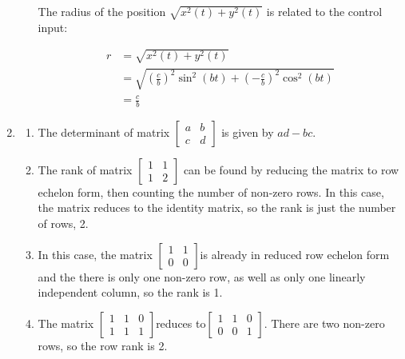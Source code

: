 \documentclass[11pt]{article}
\theoremstyle{definition}
\begin{document}
\begin{enumerate}
\begin{enumerate}
        The radius of the position $\sqrt{x^2(t) + y^2(t)}$ is related to the control input:

        \begin{align}
            r &= \sqrt{x^2(t) + y^2(t)} \\
            &= \sqrt{ \left(\frac{c}{b} \right)^2 \sin^2(bt) + \left(-\frac{c}{b} \right)^2 \cos^2(bt)} \\
            &= \frac{c}{b}
        \end{align}

    \end{enumerate}


    \item %
    \begin{enumerate}
    	\item %
    	The determinant of matrix $
    	 \begin{bmatrix}
		  a & b \\
		  c & d
		 \end{bmatrix}
		$ is given by $ ad - bc$.

    	\item %
    	The rank of matrix $
    	\begin{bmatrix}
		  1 & 1 \\
		  1 & 2
		 \end{bmatrix}
		 $ can be found by reducing the matrix to row echelon form, then counting the number of non-zero rows.  In this case, the matrix reduces to the identity matrix, so the rank is just the number of rows, 2.

    	\item %
    	In this case, the matrix $
    	\begin{bmatrix}
		  1 & 1 \\
		  0 & 0
		 \end{bmatrix}
    	$is already in reduced row echelon form and the there is only one non-zero row, as well as only one linearly independent column, so the rank is 1.

    	\item %
    	The matrix $
    	\begin{bmatrix}
		  1 & 1 & 0 \\
		  1 & 1 & 1
		 \end{bmatrix}
    	$reduces to$
    	\begin{bmatrix}
		  1 & 1 & 0 \\
		  0 & 0 & 1
		 \end{bmatrix}
		 $.  There are two non-zero rows, so the row rank is 2.


\end{enumerate}
\end{enumerate}
\end{document}
